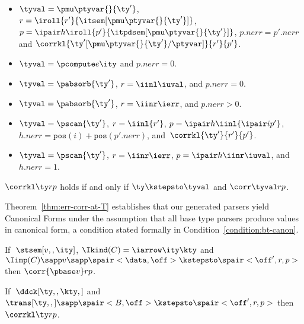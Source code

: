 \begin{definition}
\begin{itemize}
  \item $\tyval = \pmu \ptyvar {} {\ty'}$, 
    $r = \iroll{r'}{\itsem[\pmu \ptyvar {} {\ty'}]}$, $p =
    \ipair h {\iroll{p'}{
                \itpdsem[\pmu \ptyvar {} {\ty'}]}}$, 
        $p.{nerr} = p'.{nerr}$ 
    and 
    $\corrkl {\ty'[\pmu \ptyvar {} {\ty'}/\ptyvar]} {r'} {p'}$.
  \item $\tyval = \pcompute e \ity$ and $p.{nerr} = 0$.
  \item $\tyval = \pabsorb {\ty'}$, $r = \iinl \iuval$, and $p.nerr = 0$.
  \item $\tyval = \pabsorb {\ty'}$, $r = \iinr \ierr$, and $p.nerr > 0$.
  \item $\tyval = \pscan {\ty'}$, $r =\iinl {r'}$,
      $p = \ipair h {\iinl {\ipair i {p'}}}$,
      $h.nerr = \mathtt{pos}(i) + \mathtt{pos}(p'.nerr)$, and \linebreak
      $\, \corrkl {\ty'}{r'}{p'}$.
  \item $\tyval = \pscan {\ty'}$,
      $r =\iinr \ierr$,
      $p = \ipair h {\iinr \iuval}$, and
      $h.{nerr} = 1$.
  \end{itemize}
\end{definition}

\begin{definition}
$\corrkl \ty r p$ holds if and only if $\ty \kstepsto \tyval$ and $\corr \tyval r p$.
\end{definition}

Theorem~\ref{thm:err-corr-at-T} establishes that our generated parsers
yield Canonical Forms under the assumption that all base type
parsers produce values in canonical form, a condition stated formally
in Condition~\ref{condition:bt-canon}.



\begin{condition}
\label{condition:bt-canon}
  If $\;\stsem[v,,\ity]$, $\Ikind(C) = \iarrow \ity \kty$ and $\Iimp(C)
  \sapp v \sapp \spair<\data,\off> \kstepsto \spair<\off',r,p>$ then
  $\corr {\pbase v} r p $.
\end{condition}

\begin{theorem}
\label{thm:err-corr-at-T}
If $\; \ddck[\ty,,\kty,]$ and $\trans[\ty,,] \sapp \spair<B,\off> \kstepsto
  \spair<\off',r,p>$ then $\corrkl \ty r p$.
\end{theorem}

